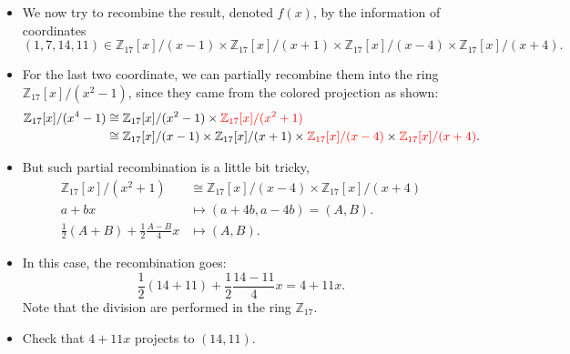 \begin{frame}
    \begin{itemize}
        \item <1->We now try to recombine the result, denoted \(f(x)\), by the information of coordinates
            \[
            (1, 7, 14, 11)\in 
                \mathbb{Z}_{17}[x]/(x-1) \times 
                \mathbb{Z}_{17}[x]/(x+1) \times 
                \mathbb{Z}_{17}[x]/(x-4) \times 
                \mathbb{Z}_{17}[x]/(x+4).
            \]
        \item <2->For the last two coordinate, we can partially recombine them into the ring 
            \( \mathbb{Z}_{17}[x]/(x^{2}-1) \), since they came from the colored projection as shown:
            \begin{align*}
                \mathbb{Z}_{17}[x]/(x^{4}-1) 
                &\cong 
                \mathbb{Z}_{17}[x]/(x^{2}-1)\times 
                {\color{red}\mathbb{Z}_{17}[x]/(x^{2}+1)}\\
                &\cong 
                \mathbb{Z}_{17}[x]/(x-1) \times 
                \mathbb{Z}_{17}[x]/(x+1) \times 
                {\color{red}\mathbb{Z}_{17}[x]/(x-4)} \times 
                {\color{red}\mathbb{Z}_{17}[x]/(x+4)}.
            \end{align*}
        \item <3->But such partial recombination is a little bit tricky,
            \begin{align*}
                \mathbb{Z}_{17}[x] / (x^{2}+1) &\cong 
                \mathbb{Z}_{17}[x] / (x - 4) \times
                \mathbb{Z}_{17}[x] / (x + 4) \\
                a + bx &\mapsto (a+4b, a-4b) = (A,B).\\
                \frac{1}{2}(A+B) + \frac{1}{2}\frac{A-B}{4}x &\mapsto (A,B).
            \end{align*}
        \item <4->In this case, the recombination goes:
            \[
                \frac{1}{2}(14+11) + \frac{1}{2}\frac{14-11}{4}x = 4 + 11x.
            \]
            Note that the division are performed in the ring \( \mathbb{Z}_{17} \).
        \item Check that \( 4 + 11x \) projects to \( (14, 11)\).
    \end{itemize}
\end{frame}


